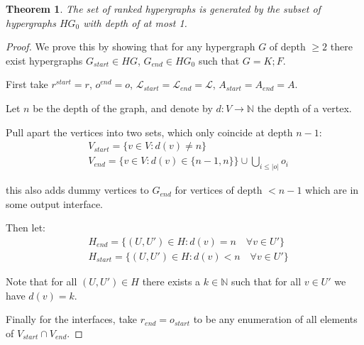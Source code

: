 \documentclass[12pt]{article}
\newtheorem{theorem}{Theorem}[section]
\theoremstyle{definition}
\newcommand{\N}{\mathbb{N}}
\newcommand{\1}{\mathbbm{1}}
\renewcommand{\L}{\mathcal{L}}
\newcommand{\seq}{;}
\begin{document}
\begin{theorem}
    The set of ranked hypergraphs is generated by the subset of hypergraphs $HG_0$ with depth of at most 1. 
\end{theorem}

\begin{proof}
    We prove this by showing that for any hypergraph $G$ of depth $\geq 2$ there exist hypergraphs $G_{start}\in HG$, $G_{end}\in HG_0$ such that $G = K\seq F$.

    First take $r^{start} = r$, $o^{end} = o$, $\L_{start} = \L_{end} = \L$, $A_{start} = A_{end} = A$.

    Let $n$ be the depth of the graph, and denote by $d: V\to \N$ the depth of a vertex.

    Pull apart the vertices into two sets, which only coincide at depth $n-1$:
    \begin{align*}
        &V_{start} = \{v\in V : d(v) \neq n \}\\
        &V_{end} = \{v\in V : d(v) \in \{n - 1, n\} \} \cup \bigcup_{i\leq |o|} o_i
    \end{align*}

    this also adds dummy vertices to $G_{end}$ for vertices of depth $< n-1$ which are in some output interface.

    Then let:
    \begin{align*}
        &H_{end} = \{(U,U')\in H : d(v) = n\quad\forall v\in U'\}\\
        &H_{start} = \{(U,U')\in H : d(v) < n\quad\forall v\in U'\}
    \end{align*}

    Note that for all $(U,U')\in H$ there exists a $k\in \N$ such that for all $v\in U'$ we have $d(v) = k$.

    Finally for the interfaces, take $r_{end} = o_{start}$ to be any enumeration of all elements of $V_{start}\cap V_{end}$.    
\end{proof}
\end{document}
